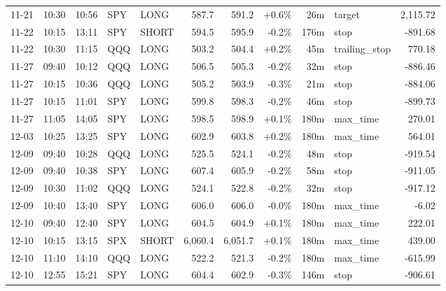 \documentclass[11pt,a4paper,twoside]{article}
\begin{document}
\begin{center}
\begin{longtable}{>{\color{txtmain}}l l l l l r r r r >{\color{txtmain}}l r}
11-21 & 10:30 & 10:56 & SPY & LONG & 587.7 & 591.2 & \textcolor{wingreen}{+0.6\%} & 26m & target & \textcolor{wingreen}{2,115.72} \\
11-22 & 10:15 & 13:11 & SPY & SHORT & 594.5 & 595.9 & \textcolor{lossred}{-0.2\%} & 176m & stop & \textcolor{lossred}{-891.68} \\
11-22 & 10:30 & 11:15 & QQQ & LONG & 503.2 & 504.4 & \textcolor{wingreen}{+0.2\%} & 45m & trailing\_stop & \textcolor{wingreen}{770.18} \\
11-27 & 09:40 & 10:12 & QQQ & LONG & 506.5 & 505.3 & \textcolor{lossred}{-0.2\%} & 32m & stop & \textcolor{lossred}{-886.46} \\
11-27 & 10:15 & 10:36 & QQQ & LONG & 505.2 & 503.9 & \textcolor{lossred}{-0.3\%} & 21m & stop & \textcolor{lossred}{-884.06} \\
11-27 & 10:15 & 11:01 & SPY & LONG & 599.8 & 598.3 & \textcolor{lossred}{-0.2\%} & 46m & stop & \textcolor{lossred}{-899.73} \\
11-27 & 11:05 & 14:05 & SPY & LONG & 598.5 & 598.9 & \textcolor{wingreen}{+0.1\%} & 180m & max\_time & \textcolor{wingreen}{270.01} \\
12-03 & 10:25 & 13:25 & SPY & LONG & 602.9 & 603.8 & \textcolor{wingreen}{+0.2\%} & 180m & max\_time & \textcolor{wingreen}{564.01} \\
12-09 & 09:40 & 10:28 & QQQ & LONG & 525.5 & 524.1 & \textcolor{lossred}{-0.2\%} & 48m & stop & \textcolor{lossred}{-919.54} \\
12-09 & 09:40 & 10:38 & SPY & LONG & 607.4 & 605.9 & \textcolor{lossred}{-0.2\%} & 58m & stop & \textcolor{lossred}{-911.05} \\
12-09 & 10:30 & 11:02 & QQQ & LONG & 524.1 & 522.8 & \textcolor{lossred}{-0.2\%} & 32m & stop & \textcolor{lossred}{-917.12} \\
12-09 & 10:40 & 13:40 & SPY & LONG & 606.0 & 606.0 & \textcolor{lossred}{-0.0\%} & 180m & max\_time & \textcolor{lossred}{-6.02} \\
12-10 & 09:40 & 12:40 & SPY & LONG & 604.5 & 604.9 & \textcolor{wingreen}{+0.1\%} & 180m & max\_time & \textcolor{wingreen}{222.01} \\
12-10 & 10:15 & 13:15 & SPX & SHORT & 6,060.4 & 6,051.7 & \textcolor{wingreen}{+0.1\%} & 180m & max\_time & \textcolor{wingreen}{439.00} \\
12-10 & 11:10 & 14:10 & QQQ & LONG & 522.2 & 521.3 & \textcolor{lossred}{-0.2\%} & 180m & max\_time & \textcolor{lossred}{-615.99} \\
12-10 & 12:55 & 15:21 & SPY & LONG & 604.4 & 602.9 & \textcolor{lossred}{-0.3\%} & 146m & stop & \textcolor{lossred}{-906.61} \\

\end{longtable}
\end{center}
\end{document}
